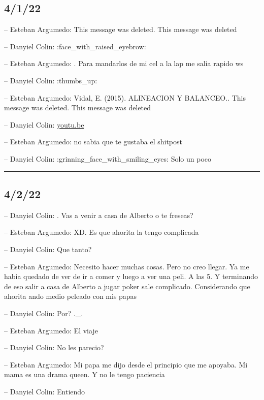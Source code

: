 \hypertarget{section-45}{%
\subsection{4/1/22}\label{section-45}}

-- Esteban Argumedo: This message was deleted. This message was deleted

-- Danyiel Colin: :face\_with\_raised\_eyebrow:

-- Esteban Argumedo: . Para mandarlos de mi cel a la lap me salia rapido
ws

-- Danyiel Colin: :thumbs\_up:

-- Esteban Argumedo: Vidal, E. (2015). ALINEACION Y BALANCEO.. This
message was deleted. This message was deleted

-- Danyiel Colin: \href{https://youtu.be/8sNekrl9x9g}{youtu.be}

-- Esteban Argumedo: no sabia que te gustaba el shitpost

-- Danyiel Colin: :grinning\_face\_with\_smiling\_eyes: Solo un poco

\begin{center}\rule{0.5\linewidth}{0.5pt}\end{center}

\hypertarget{section-46}{%
\subsection{4/2/22}\label{section-46}}

-- Danyiel Colin: . Vas a venir a casa de Alberto o te freseas?

-- Esteban Argumedo: XD. Es que ahorita la tengo complicada

-- Danyiel Colin: Que tanto?

-- Esteban Argumedo: Necesito hacer muchas cosas. Pero no creo llegar.
Ya me habia quedado de ver de ir a comer y luego a ver una peli. A las
5. Y terminando de eso salir a casa de Alberto a jugar poker sale
complicado. Considerando que ahorita ando medio peleado con mis papas

-- Danyiel Colin: Por? .\_.

-- Esteban Argumedo: El viaje

-- Danyiel Colin: No les parecio?

-- Esteban Argumedo: Mi papa me dijo desde el principio que me apoyaba.
Mi mama es una drama queen. Y no le tengo paciencia

-- Danyiel Colin: Entiendo


